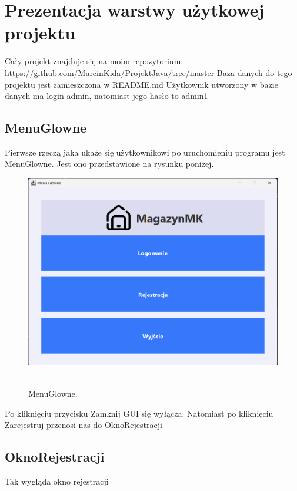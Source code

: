 \chapter{Prezentacja warstwy użytkowej projektu}
\label{chap:Prezentacja warstwy użytkowej projektu}

Cały projekt znajduje się na moim repozytorium: \url{https://github.com/MarcinKida/ProjektJava/tree/master}
Baza danych do tego projektu jest zamieszczona w README.md 
Użytkownik utworzony w bazie danych ma login admin, natomiast jego hasło to admin1


\section{MenuGlowne}
\label{sec:MenuGlowne}

Pierwsze rzeczą jaka ukaże się użytkownikowi po uruchomieniu programu jest MenuGlowne. Jest ono przedstawione na rysunku poniżej.


\begin{figure}[H]
    \centering
    \includegraphics[width=.9\linewidth]{figures/MenuGlowne.png}\
    \caption{MenuGlowne.\label{MenuGlowne}}
\end{figure}

Po kliknięciu przycisku Zamknij GUI się wyłącza. Natomiast po kliknięciu Zarejestruj przenosi nas do OknoRejestracji

\section{OknoRejestracji}
\label{sec:OknoRejestracji}

Tak wygląda okno rejestracji

